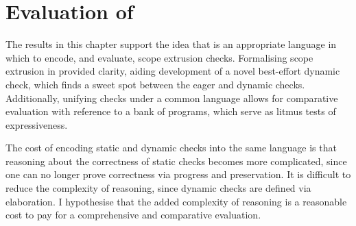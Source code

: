 \section{Evaluation of \texorpdfstring{\sourceLang{}}{Lambda-Op-Quote-Splice}} \label{section:evaluation}
The results in this chapter support the idea that \sourceLang{} is an appropriate language in which to encode, and evaluate, scope extrusion checks. Formalising scope extrusion in \sourceLang{} provided clarity, aiding development of a novel best-effort dynamic check, which finds a sweet spot between the eager and dynamic checks. Additionally, unifying checks under a common language allows for comparative evaluation with reference to a bank of \sourceLang{} programs, which serve as litmus tests of expressiveness.

The cost of encoding static and dynamic checks into the same language is that reasoning about the correctness of static checks becomes more complicated, since one can no longer prove correctness via progress and preservation. It is difficult to reduce the complexity of reasoning, since dynamic checks are defined via elaboration. I hypothesise that the added complexity of reasoning is a reasonable cost to pay for a comprehensive and comparative evaluation.



